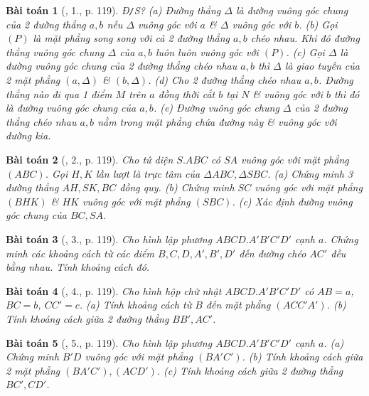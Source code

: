 \documentclass{article}
\numberwithin{equation}{section}
\newtheorem{baitoan}{Bài toán}
\begin{document}
\begin{baitoan}[\cite{SGK_Toan_11_hinh_hoc_co_ban}, 1., p. 119]
	\emph{Đ\texttt{/}S?} (a) Đường thẳng $\Delta$ là đường vuông góc chung của 2 đường thẳng $a,b$ nếu $\Delta$ vuông góc với $a$ \& $\Delta$ vuông góc với $b$. (b) Gọi $(P)$ là mặt phẳng song song với cả 2 đường thẳng $a,b$ chéo nhau. Khi đó đường thẳng vuông góc chung $\Delta$ của $a,b$ luôn luôn vuông góc với $(P)$. (c) Gọi $\Delta$ là đường vuông góc chung của 2 đường thẳng chéo nhau $a,b$ thì $\Delta$ là giao tuyến của 2 mặt phẳng $(a,\Delta)$ \& $(b,\Delta)$. (d) Cho 2 đường thẳng chéo nhau $a,b$. Đường thẳng nào đi qua 1 điểm $M$ trên $a$ đồng thời cắt $b$ tại $N$ \& vuông góc với $b$ thì đó là đường vuông góc chung của $a,b$. (e) Đường vuông góc chung $\Delta$ của 2 đường thẳng chéo nhau $a,b$ nằm trong mặt phẳng chứa đường này \& vuông góc với đường kia.
\end{baitoan}

\begin{baitoan}[\cite{SGK_Toan_11_hinh_hoc_co_ban}, 2., p. 119]
	Cho tứ diện $S.ABC$ có $SA$ vuông góc với mặt phẳng $(ABC)$. Gọi $H,K$ lần lượt là trực tâm của $\Delta ABC,\Delta SBC$. (a) Chứng minh 3 đường thẳng $AH,SK,BC$ đồng quy. (b) Chứng minh $SC$ vuông góc với mặt phẳng $(BHK)$ \& $HK$ vuông góc với mặt phẳng $(SBC)$. (c) Xác định đường vuông góc chung của $BC,SA$.
\end{baitoan}

\begin{baitoan}[\cite{SGK_Toan_11_hinh_hoc_co_ban}, 3., p. 119]
	Cho hình lập phương $ABCD.A'B'C'D'$ cạnh $a$. Chứng minh các khoảng cách từ các điểm $B,C,D,A',B',D'$ đến đường chéo $AC'$ đều bằng nhau. Tính khoảng cách đó.
\end{baitoan}

\begin{baitoan}[\cite{SGK_Toan_11_hinh_hoc_co_ban}, 4., p. 119]
	Cho hình hộp chữ nhật $ABCD.A'B'C'D'$ có $AB = a$, $BC = b$, $CC' = c$. (a) Tính khoảng cách từ $B$ đến mặt phẳng $(ACC'A')$. (b) Tính khoảng cách giữa 2 đường thẳng $BB',AC'$.
\end{baitoan}

\begin{baitoan}[\cite{SGK_Toan_11_hinh_hoc_co_ban}, 5., p. 119]
	Cho hình lập phương $ABCD.A'B'C'D'$ cạnh $a$. (a) Chứng minh $B'D$ vuông góc với mặt phẳng $(BA'C')$. (b) Tính khoảng cách giữa 2 mặt phẳng $(BA'C'),(ACD')$. (c) Tính khoảng cách giữa 2 đường thẳng $BC',CD'$.
\end{baitoan}
\end{document}
